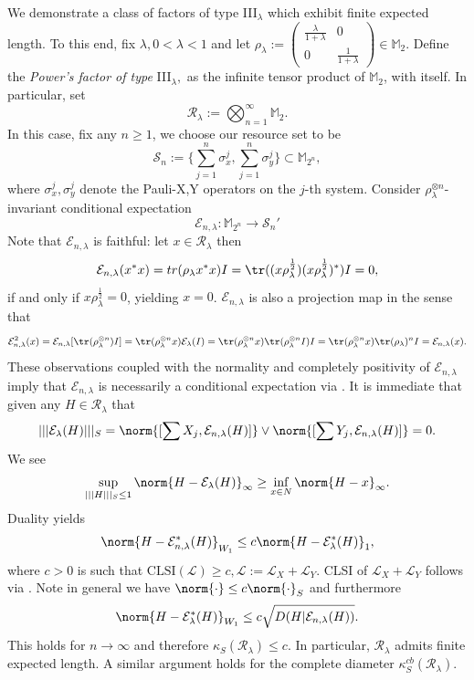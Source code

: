 \documentclass[11pt,reqno]{amsart}
\numberwithin{equation}{section}
\newcommand{\mb}{\mathbb}
\newcommand{\mc}{\mathcal}
\begin{document}
We demonstrate a class of factors of type III$_\lambda$ which exhibit finite expected length. To this end, fix $\lambda, 0 < \lambda < 1$ and let $\rho_\lambda:= \begin{pmatrix} \frac{\lambda}{1+\lambda}& 0\\0&\frac{1}{1+\lambda}\end{pmatrix} \in \mathbb M_2$. Define the \emph{Power's factor of type} III$_\lambda,$ as the infinite tensor product of $\mathbb M_{2}$, with itself. In particular, set \[
\mathcal R_\lambda:=\bigotimes_{n=1}^\infty \mathbb M_{2}. 
\] 
In this case, fix any $n\ge 1$, we choose our resource set to be \[
\mc S_n:= \{\sum_{j=1}^n \sigma_x^j, \sum_{j=1}^n \sigma_y^j\} \subset \mathbb M_{2^n}
,\]
where $\sigma_x^j,\sigma_y^j$ denote the Pauli-X,Y operators on the $j$-th system.
\color{red}
Consider $\rho_{\lambda}^{\otimes n}$-invariant conditional expectation \
\begin{equation}
    \mathcal E_{n,\lambda}: \mb M_{2^n} \to \mc S_n'
\end{equation}
Note that $\mathcal E_{n,\lambda}$ is faithful: let $x \in \mathcal R_\lambda$ then  \[
\mathcal E_{n,\lambda}(x^*x) = tr(\rho_\lambda x^*x)I = \tr((x\rho_\lambda^{\frac{1}{2}})(x\rho_\lambda^{\frac{1}{2}})^*)I = 0,
\] if and only if $x\rho_\lambda^{\frac{1}{2}} = 0$, yielding $x = 0$. $\mathcal E_{n,\lambda}$ is also a projection map in the sense that \[
\mathcal E_{n,\lambda}^2(x) = \mathcal E_{n,\lambda}[\tr(\rho_\lambda^{\otimes n})I] = \tr(\rho_\lambda^{\otimes n}x) \mathcal E_{\lambda}(I) = \tr(\rho_\lambda^{\otimes n}x) \tr(\rho_\lambda^{\otimes n} I) I = \tr(\rho_\lambda^{\otimes n}x) \tr(\rho_\lambda)^n I = \mathcal E_{n,\lambda}(x).
\] These observations coupled with the normality and completely positivity of $\mathcal E_{n,\lambda}$ imply that $\mathcal E_{n,\lambda}$ is necessarily a conditional expectation via \cite[Proposition 3.2]{stormer1997conditional}. It is immediate that given any $H \in \mathcal R_\lambda$ that \[
|||\mathcal E_{\lambda}(H)|||_S = \norm{[\sum X_j, \mathcal E_{n,\lambda}(H)]} \vee \norm{[\sum Y_j, \mathcal E_{n,\lambda}(H)]} = 0.
\] We see \[
\sup_{|||H|||_S \leq 1} \norm{H - \mathcal E_{\lambda}(H)}_\infty \geq \inf_{x \in N} \norm{H -x}_\infty.
\] Duality yields \[
\norm{H - \mathcal E_{n,\lambda}^*(H)}_{W_1} \leq c \norm{H - \mathcal E_{\lambda}^*(H)}_1,
\] where $c >0$ is such that $\text{CLSI}(\mathcal L) \geq c, \mathcal L := \mathcal L_X+ \mathcal L_Y$. CLSI of $\mathcal L_X + \mathcal L_Y$ follows via \cite{gao2020fisher}. Note in general we have $\norm{\cdot} \leq c\norm{\cdot}_S$ and furthermore \[
\norm{H - \mathcal E_{\lambda}^*(H)}_{W_1} \leq c \sqrt{D(H|\mathcal E_{n,\lambda}(H))}. 
\] This holds for $n \to \infty$ and therefore $\kappa_S(\mathcal R_\lambda) \leq c$. In particular, $\mathcal R_\lambda$ admits finite expected length. A similar argument holds for the complete diameter $\kappa_S^{cb}(\mathcal R_\lambda)$.
\color{black}
\fi
\end{document}
